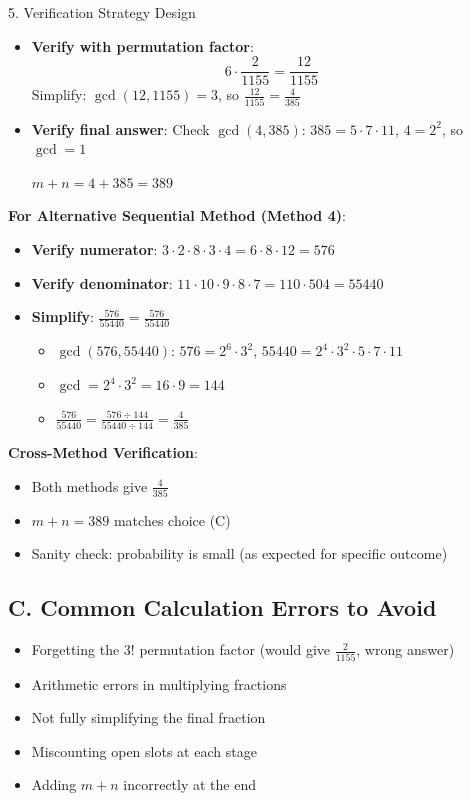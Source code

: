 \documentclass[12pt]{article}
\begin{document}
\begin{verificationbox}{5. Verification Strategy Design}
\begin{itemize}
    \item \textbf{Verify with permutation factor}:
    \[6 \cdot \frac{2}{1155} = \frac{12}{1155}\]
    Simplify: $\gcd(12, 1155) = 3$, so $\frac{12}{1155} = \frac{4}{385}$ \checkmark
    
    \item \textbf{Verify final answer}:
    Check $\gcd(4, 385)$: $385 = 5 \cdot 7 \cdot 11$, $4 = 2^2$, so $\gcd = 1$ \checkmark
    
    $m + n = 4 + 385 = 389$ \checkmark
\end{itemize}

\textbf{For Alternative Sequential Method (Method 4)}:
\begin{itemize}
    \item \textbf{Verify numerator}: $3 \cdot 2 \cdot 8 \cdot 3 \cdot 4 = 6 \cdot 8 \cdot 12 = 576$ \checkmark
    
    \item \textbf{Verify denominator}: $11 \cdot 10 \cdot 9 \cdot 8 \cdot 7 = 110 \cdot 504 = 55440$ \checkmark
    
    \item \textbf{Simplify}: $\frac{576}{55440} = \frac{576}{55440}$
    \begin{itemize}
        \item $\gcd(576, 55440)$: $576 = 2^6 \cdot 3^2$, $55440 = 2^4 \cdot 3^2 \cdot 5 \cdot 7 \cdot 11$
        \item $\gcd = 2^4 \cdot 3^2 = 16 \cdot 9 = 144$
        \item $\frac{576}{55440} = \frac{576 \div 144}{55440 \div 144} = \frac{4}{385}$ \checkmark
    \end{itemize}
\end{itemize}

\textbf{Cross-Method Verification}:
\begin{itemize}
    \item Both methods give $\frac{4}{385}$ \checkmark
    \item $m + n = 389$ matches choice (C) \checkmark
    \item Sanity check: probability is small (as expected for specific outcome) \checkmark
\end{itemize}

\subsection*{C. Common Calculation Errors to Avoid}
\begin{itemize}[leftmargin=*]
    \item Forgetting the $3!$ permutation factor (would give $\frac{2}{1155}$, wrong answer)
    \item Arithmetic errors in multiplying fractions
    \item Not fully simplifying the final fraction
    \item Miscounting open slots at each stage
    \item Adding $m+n$ incorrectly at the end
\end{itemize}

\end{verificationbox}
\end{document}
